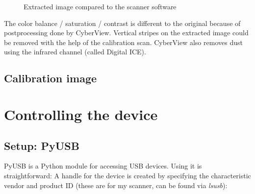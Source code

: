 \documentclass{article}
\begin{document}
\begin{figure}[H]
    \centering
    
    \caption{Extracted image compared to the scanner software}
\end{figure}

The color balance / saturation / contrast is different to the original because of postprocessing
done by CyberView. Vertical stripes on the extracted image could be removed with
the help of the calibration scan.
CyberView also removes dust using the infrared channel (called Digital ICE).

\subsection{Calibration image}
\label{ssec:calibration}

\section{Controlling the device}

\subsection{Setup: PyUSB}

PyUSB \cite{pyusb} is a Python module for accessing USB devices.
Using it is straightforward:
A handle for the device is created by specifying the characteristic
vendor and product ID (these are for my scanner, can be found via {\it lsusb}):
\end{document}
